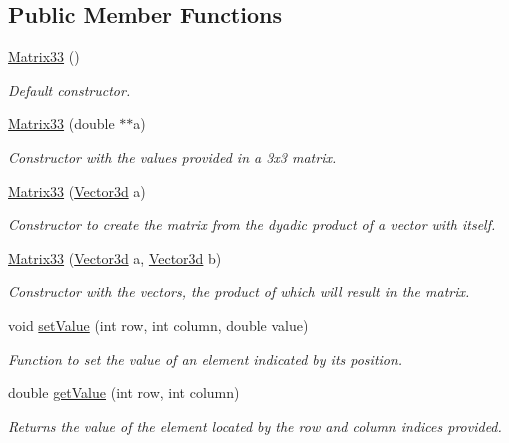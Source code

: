 \subsection*{\-Public \-Member \-Functions}
\begin{DoxyCompactItemize}
\item 
\hyperlink{classMatrix33_a70acb6647b172d017cc4265a29a7d263}{\-Matrix33} ()
\begin{DoxyCompactList}\small\item\em \-Default constructor. \end{DoxyCompactList}\item 
\hyperlink{classMatrix33_a4399c6da8f1ac31ce514550282c823cf}{\-Matrix33} (double $\ast$$\ast$a)
\begin{DoxyCompactList}\small\item\em \-Constructor with the values provided in a 3x3 matrix. \end{DoxyCompactList}\item 
\hyperlink{classMatrix33_a1f070a29a710043c38b56cee8214e6f7}{\-Matrix33} (\hyperlink{classVector3d}{\-Vector3d} a)
\begin{DoxyCompactList}\small\item\em \-Constructor to create the matrix from the dyadic product of a vector with itself. \end{DoxyCompactList}\item 
\hyperlink{classMatrix33_a7f1deae895c26e47c39c76bfaa31d3d2}{\-Matrix33} (\hyperlink{classVector3d}{\-Vector3d} a, \hyperlink{classVector3d}{\-Vector3d} b)
\begin{DoxyCompactList}\small\item\em \-Constructor with the vectors, the product of which will result in the matrix. \end{DoxyCompactList}\item 
void \hyperlink{classMatrix33_a6cdcec77fd089b2e73ad7ae85ecff30b}{set\-Value} (int row, int column, double value)
\begin{DoxyCompactList}\small\item\em \-Function to set the value of an element indicated by its position. \end{DoxyCompactList}\item 
double \hyperlink{classMatrix33_a849bbdf7b456ddacf7185b087fca4015}{get\-Value} (int row, int column)
\begin{DoxyCompactList}\small\item\em \-Returns the value of the element located by the row and column indices provided. \end{DoxyCompactList}\item 
$$
\end{DoxyCompactItemize}

